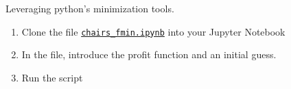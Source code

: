 \documentclass{workbook}
\begin{document}
\begin{slide}

\begin{parts}
\setcounter{partsitem}{5}
	\item Leveraging python's minimization tools.
	\begin{enumerate}
		\item Clone the file \href{https://utoronto.syzygy.ca/jupyter/user-redirect/git-pull?repo=https://github.com/bigfatbernie/IBLMathModeling&subPath=python/chairs_fmin.ipynb}{\tt chairs\_fmin.ipynb} into your Jupyter Notebook
		\item In the file, introduce the profit function and an initial guess.
		\item Run the script
	\end{enumerate}
\end{parts}
\end{slide}
\end{document}
